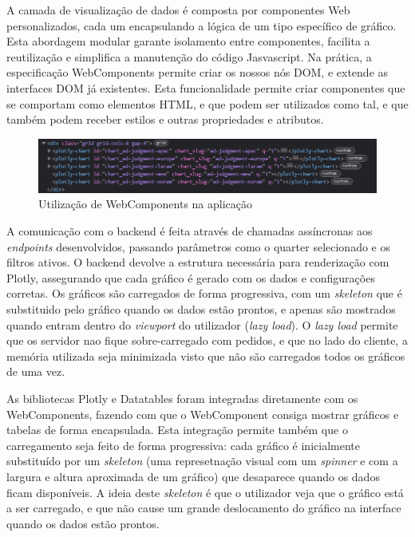 A camada de visualização de dados é composta por componentes Web personalizados, cada um encapsulando a lógica de um tipo específico de gráfico. Esta abordagem modular garante isolamento entre componentes, facilita a reutilização e simplifica a manutenção do código Jasvascript. Na prática, a especificação WebComponents permite criar os nossos nós DOM, e extende as interfaces DOM já existentes. Esta funcionalidade permite criar componentes que se comportam como elementos HTML, e que podem ser utilizados como tal, e que também podem receber estilos e outras propriedades e atributos. 

\begin{figure}[H]
    \centering
    \includegraphics[width=\textwidth]{./img/webc}
 \caption{Utilização de WebComponents na aplicação}
 \end{figure}

A comunicação com o backend é feita através de chamadas assíncronas aos \textit{endpoints} desenvolvidos, passando parâmetros como o quarter selecionado e os filtros ativos. O backend devolve a estrutura necessária para renderização com Plotly, assegurando que cada gráfico é gerado com os dados e configurações corretas. Os gráficos são carregados de forma progressiva, com um \textit{skeleton} que é substituido pelo gráfico quando os dados estão prontos, e apenas são mostrados quando entram dentro do \textit{viewport} do utilizador (\textit{lazy load}). O \textit{lazy load} permite que os servidor nao fique sobre-carregado com pedidos, e que no lado do cliente, a memória utilizada seja minimizada visto que não são carregados todos os gráficos de uma vez.	

As bibliotecas Plotly e Datatables foram integradas diretamente com os WebComponents, fazendo com que o WebComponent consiga mostrar gráficos e tabelas de forma encapsulada. Esta integração permite também que o carregamento seja feito de forma progressiva: cada gráfico é inicialmente substituído por um \textit{skeleton} (uma represetnação visual com um \textit{spinner} e com a largura e altura aproximada de um gráfico) que desaparece quando os dados ficam disponíveis. A ideia deste \textit{skeleton} é que o utilizador veja que o gráfico está a ser carregado, e que não cause um grande deslocamento do gráfico na interface quando os dados estão prontos.

